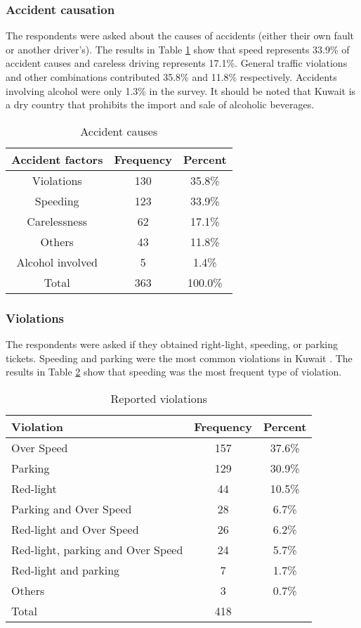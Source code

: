 \documentclass[preprint,12pt,a4paper,authoryear]{elsarticle}
\begin{document}
\begin{linenumbers}
\subsubsection{Accident causation}
The respondents were asked about the causes of accidents (either their own fault or another driver's). The results in Table \ref{tab:causes} show that speed represents 33.9\% of accident causes and careless driving represents 17.1\%. General traffic violations and other combinations contributed 35.8\% and 11.8\% respectively.  Accidents involving alcohol were only 1.3\% in the survey.  It should be noted that Kuwait is a dry country that prohibits the import and sale of alcoholic beverages. 

\begin{table}[H]
\centering
\caption{Accident causes}
\label{tab:causes}
\begin{tabular}{@{}ccc@{}}
\toprule
\textbf{Accident factors} & \textbf{Frequency} & \textbf{Percent} \\ \midrule
Violations & 130 & 35.8\% \\
Speeding & 123 & 33.9\% \\
Carelessness & 62 & 17.1\% \\
Others & 43 & 11.8\% \\
Alcohol involved & 5 & 1.4\% \\
Total & 363 & 100.0\% \\ \bottomrule
\end{tabular}
\end{table}

\subsubsection{Violations}
The respondents were asked if they obtained right-light, speeding, or parking tickets. Speeding and parking were the most common violations in Kuwait \citep{CSB2017}. The results in Table \ref{tab:violations} show that speeding was the most frequent type of violation.

\begin{table}[H]
\centering
\caption{Reported violations}
\label{tab:violations}
\begin{tabular}{@{}lcc@{}}
\toprule
\textbf{Violation} & \textbf{Frequency} & \textbf{Percent} \\ \midrule
Over Speed & 157 & 37.6\% \\
Parking & 129 & 30.9\% \\
Red-light & 44 & 10.5\% \\
Parking and Over Speed & 28 & 6.7\% \\
Red-light and Over Speed & 26 & 6.2\% \\
Red-light, parking and Over Speed & 24 & 5.7\% \\
Red-light and parking & 7 & 1.7\% \\
Others & 3 & 0.7\% \\
Total & 418 &  \\ \bottomrule
\end{tabular}
\end{table}


\end{linenumbers}
\end{document}
